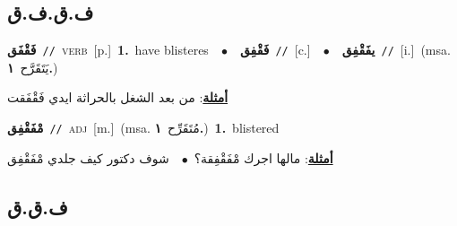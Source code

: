 \documentclass[10pt,a4paper,twoside]{article} %
\begin{document}
\begin{multicols}{2}
\vspace{-3mm}
\subsection*{\color{blue}\foreignlanguage{arabic}{ف.ق.ف.ق}\color{blue}{}} 

{\setlength\topsep{0pt}\textbf{\foreignlanguage{arabic}{فَقْفَق}}\ {\color{gray}\texttt{//}\color{black}}\ \textsc{verb}\ [p.]\ \textbf{1.}~have blisteres\ \ $\bullet$\ \ \setlength\topsep{0pt}\textbf{\foreignlanguage{arabic}{فَقْفِق}}\ {\color{gray}\texttt{//}\color{black}}\ [c.]\ \ $\bullet$\ \ \setlength\topsep{0pt}\textbf{\foreignlanguage{arabic}{يفَقْفِق}}\ {\color{gray}\texttt{//}\color{black}}\ [i.]\ \color{gray}(msa. \foreignlanguage{arabic}{يَتَقَرَّح}~\foreignlanguage{arabic}{\textbf{١.}})\color{black}\  \begin{flushright}\color{gray}\foreignlanguage{arabic}{\textbf{\underline{\foreignlanguage{arabic}{أمثلة}}}: من بعد الشغل بالحراثة ايدي فَقْفَقت}\end{flushright}\color{black}} \vspace{2mm}

{\setlength\topsep{0pt}\textbf{\foreignlanguage{arabic}{مْفَقْفِق}}\ {\color{gray}\texttt{//}\color{black}}\ \textsc{adj}\ [m.]\ \color{gray}(msa. \foreignlanguage{arabic}{مُتَقَرِّح}~\foreignlanguage{arabic}{\textbf{١.}})\color{black}\ \textbf{1.}~blistered\  \begin{flushright}\color{gray}\foreignlanguage{arabic}{\textbf{\underline{\foreignlanguage{arabic}{أمثلة}}}: مالها اجرك مْفَقْفِقة؟\ $\bullet$\ \  شوف دكتور كيف جلدي مْفَقْفِق}\end{flushright}\color{black}} \vspace{2mm}

\vspace{-3mm}
\subsection*{\color{blue}\foreignlanguage{arabic}{ف.ق.ق}\color{blue}{}} 


\end{multicols}
\end{document}
